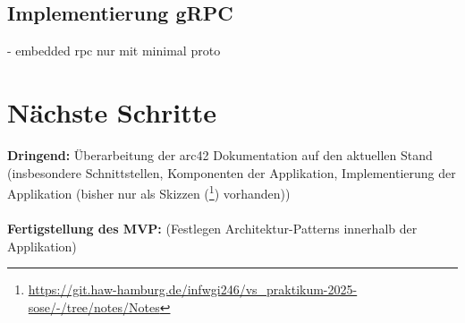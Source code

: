 \documentclass{article}
\begin{document}
\subsection{Implementierung gRPC}
- embedded rpc nur mit minimal proto



 
\section{Nächste Schritte}
\textbf{Dringend:} Überarbeitung der arc42 Dokumentation auf den aktuellen Stand (insbesondere Schnittstellen, Komponenten der Applikation, Implementierung der Applikation (bisher nur als Skizzen (\footnote{\url{https://git.haw-hamburg.de/infwgi246/vs_praktikum-2025-sose/-/tree/notes/Notes}}) vorhanden))
\\\\\textbf{Fertigstellung des MVP:} (Festlegen Architektur-Patterns innerhalb der Applikation)
\end{document}
